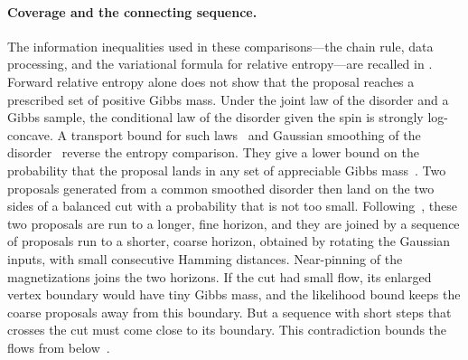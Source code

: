 \paragraph{Coverage and the connecting sequence.}
The information inequalities used in these comparisons---the chain rule,
data processing, and the variational formula for relative entropy---are
recalled in \cite[Chapter~4]{boucheron-lugosi-massart-2013}.
Forward relative entropy alone does not show that the proposal reaches a
prescribed set of positive Gibbs mass. Under the joint law of the disorder
and a Gibbs sample, the conditional law of the disorder given the spin is
strongly log-concave. A transport bound for such
laws~\cite[Corollary~3.10]{bogachev-kolesnikov-medvedev-2005} and Gaussian
smoothing of the disorder~\cite[Lemma~11]{lugosi-neu-2022} reverse the entropy
comparison. They give a lower bound on the probability that the proposal lands
in any set of appreciable Gibbs mass~\cite[Section~5,
Proposition~6]{oai-typical-upper}. Two proposals generated from a common
smoothed disorder then land on the two sides of a balanced cut with a
probability that is not too small. Following~\cite{oai-typical-upper}, these
two proposals are run to a longer, fine horizon, and they are joined by a
sequence of proposals run to a shorter, coarse horizon, obtained by rotating
the Gaussian inputs, with small consecutive Hamming distances. Near-pinning of
the magnetizations joins the two horizons. If the cut had small flow, its
enlarged vertex boundary would have tiny Gibbs mass, and the likelihood bound
keeps the coarse proposals away from this boundary. But a sequence with short
steps that crosses the cut must come close to its boundary. This
contradiction bounds the flows from below~\cite[Section~6,
Proposition~7]{oai-typical-upper}.

